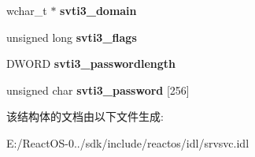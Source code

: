 \begin{DoxyCompactItemize}
wchar\+\_\+t $\ast$ {\bfseries svti3\+\_\+domain}
\item 
\mbox{\label{struct___s_e_r_v_e_r___t_r_a_n_s_p_o_r_t___i_n_f_o__3_afaad1f81b24d31e4f3025c65845b585f}} 
unsigned long {\bfseries svti3\+\_\+flags}
\item 
\mbox{\label{struct___s_e_r_v_e_r___t_r_a_n_s_p_o_r_t___i_n_f_o__3_ab3c7f3125417e1015c22fd72acffc089}} 
D\+W\+O\+RD {\bfseries svti3\+\_\+passwordlength}
\item 
\mbox{\label{struct___s_e_r_v_e_r___t_r_a_n_s_p_o_r_t___i_n_f_o__3_ab4f715bfdf556fdea77ec334f2b7b23a}} 
unsigned char {\bfseries svti3\+\_\+password} \mbox{[}256\mbox{]}
\end{DoxyCompactItemize}


该结构体的文档由以下文件生成\+:\begin{DoxyCompactItemize}
\item 
E\+:/\+React\+O\+S-\/0../sdk/include/reactos/idl/srvsvc.\+idl\end{DoxyCompactItemize}
